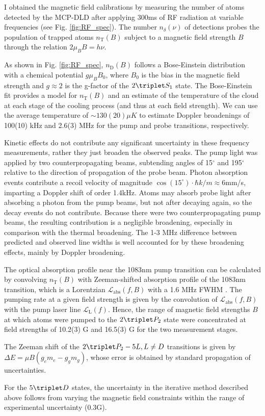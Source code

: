 {I obtained the magnetic field calibrations by measuring the number of atoms detected by the MCP-DLD after applying 300ms of RF radiation at variable frequencies (see Fig. \ref{fig:RF_spec}).
The number $n_\delta(\nu)$ of detections probes the population of trapped atoms $n_\text{T}(B)$ subject to a magnetic field strength $B$ through the relation $2 \mu_B B = h \nu$.
	
As shown in Fig.
	\ref{fig:RF_spec}, $n_\text{D}(B)$ follows a Bose-Einstein distribution with a chemical potential $g \mu_B B_0$, where $B_0$ is the bias in the magnetic field strength and $g\approx2$ is the g-factor of the $2\triplet S_1$ state.
	The Bose-Einstein fit provides a model for $n_\text{T}(B)$ and an estimate of the temperature of the cloud at each stage of the cooling process (and thus at each field strength).
	We can use the average temperature of $\sim130(20)\mu K$ to estimate  Doppler broadenings of 100(10) kHz and 2.6(3) MHz for the pump and probe transitions, respectively.

	Kinetic effects do not contribute any significant uncertainty in these frequency measurements, rather they just broaden the observed peaks.
	The pump light was applied by two counterpropagating beams, subtending angles of 15$^\circ$ and 195$^\circ$ relative to the direction of propagation of the probe beam.
	Photon absorption events contribute a recoil velocity of magnitude $\cos(15^\circ)\cdot\hbar k/m\approx6$mm/s, imparting a Doppler shift of order 1.4kHz.
	Atoms may absorb probe light after absorbing a photon from the pump beams, but not after decaying again, so the decay events do not contribute.
	Because there were two counterpropagating pump beams, the resulting contribution is a negligible broadening, especially in comparison with the thermal broadening.
	The 1-3 MHz difference between predicted and observed line widths is well accounted for by these broadening effects, mainly by Doppler broadening.

	The optical absorption profile near the 1083nm pump transition can be calculated by convolving $n_\text{T}(B)$ with Zeeman-shifted absorption profile of the 1083nm transition, which is a Lorentzian $\mathcal{L}_\text{abs}(f,B)$ with a 1.6 MHz FWHM \cite{Drake07}.
	The pumping rate at a given field strength is given by the convolution of $\mathcal{L}_\text{abs}(f,B)$ with the pump laser line $\mathcal{L}_\text{L}(f)$.
	Hence, the range of magnetic field strengths $B$ at which atoms were pumped to the $2\triplet P_2$ state were concentrated at field strengths of 10.2(3) G and 16.5(3) G for the two measurement stages.

	The Zeeman shift of the $2\triplet P_2 - 5L, L\neq D$ transitions is given by $\Delta E = \mu B (g_e m_e-g_g m_g)$, whose error is obtained by standard propagation of uncertainties.
	
	For the $5\triplet D$ states, the uncertainty in the iterative method described above follows from varying the magnetic field constraints within the range of experimental uncertainty ($0.3$G). }


